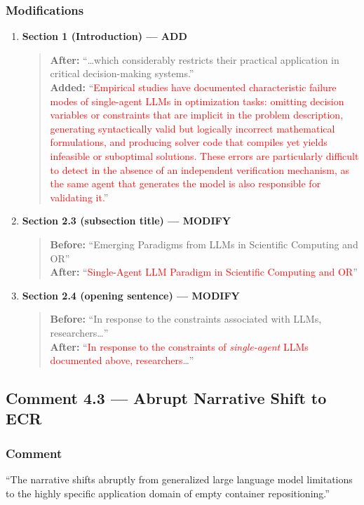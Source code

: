 \documentclass[11pt,a4paper]{article}
\begin{document}
\subsubsection{Modifications}
\begin{enumerate}
\item \textbf{Section 1 (Introduction) --- ADD}
\begin{quote}
\textbf{After:} ``\ldots which considerably restricts their practical application in critical decision-making systems.''\\[4pt]
\textbf{Added:} ``\textcolor{red}{Empirical studies have documented characteristic failure modes of single-agent LLMs in optimization tasks: omitting decision variables or constraints that are implicit in the problem description, generating syntactically valid but logically incorrect mathematical formulations, and producing solver code that compiles yet yields infeasible or suboptimal solutions. These errors are particularly difficult to detect in the absence of an independent verification mechanism, as the same agent that generates the model is also responsible for validating it.}''
\end{quote}
\item \textbf{Section 2.3 (subsection title) --- MODIFY}
\begin{quote}
\textbf{Before:} ``Emerging Paradigms from LLMs in Scientific Computing and OR''\\[4pt]
\textbf{After:} ``\textcolor{red}{Single-Agent LLM Paradigm in Scientific Computing and OR}''
\end{quote}
\item \textbf{Section 2.4 (opening sentence) --- MODIFY}
\begin{quote}
\textbf{Before:} ``In response to the constraints associated with LLMs, researchers\ldots''\\[4pt]
\textbf{After:} ``\textcolor{red}{In response to the constraints of \emph{single-agent} LLMs documented above, researchers}\ldots''
\end{quote}
\end{enumerate}

\subsection{Comment 4.3 --- Abrupt Narrative Shift to ECR}

\subsubsection{Comment}
``The narrative shifts abruptly from generalized large language model limitations to the highly specific application domain of empty container repositioning.''
\end{document}
